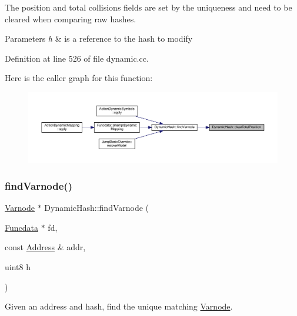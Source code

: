 The position and total collisions fields are set by the uniqueness and need to be cleared when comparing raw hashes. 
\begin{DoxyParams}{Parameters}
{\em h} & is a reference to the hash to modify \\
\hline
\end{DoxyParams}


Definition at line 526 of file dynamic.\+cc.

Here is the caller graph for this function\+:
\nopagebreak
\begin{figure}[H]
\begin{center}
\leavevmode
\includegraphics[width=350pt]{class_dynamic_hash_a4eb9f9e5767cc8c956a0111d4a5ca89b_icgraph}
\end{center}
\end{figure}
\mbox{\label{class_dynamic_hash_a0fa4ec613c4bcd4954034e774abee892}} 
\subsubsection{\texorpdfstring{findVarnode()}{findVarnode()}}
{\footnotesize\ttfamily \mbox{\hyperlink{class_varnode}{Varnode}} $\ast$ Dynamic\+Hash\+::find\+Varnode (\begin{DoxyParamCaption}\item[{\mbox{\hyperlink{class_funcdata}{Funcdata}} $\ast$}]{fd,  }\item[{const \mbox{\hyperlink{class_address}{Address}} \&}]{addr,  }\item[{uint8}]{h }\end{DoxyParamCaption})}



Given an address and hash, find the unique matching \mbox{\hyperlink{class_varnode}{Varnode}}. 

